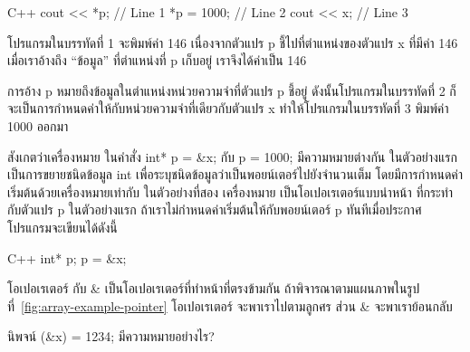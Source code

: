 \latintext
\begin{codelist}{C++}{}
cout << *p;       // Line 1
*p = 1000;        // Line 2
cout << x;        // Line 3
\end{codelist}
\thaitext

โปรแกรม{\wbr}ใน{\wbr}บรรทัด{\wbr}ที่ 1 จะ{\wbr}พิมพ์{\wbr}ค่า 146 เนื่องจาก{\wbr}ตัวแปร {\ct p} ชี้{\wbr}ไป{\wbr}ที่{\wbr}ตำแหน่ง{\wbr}ของ{\wbr}ตัวแปร{\wbr}
{\ct x} ที่{\wbr}มี{\wbr}ค่า 146 เมื่อ{\wbr}เรา{\wbr}อ้าง{\wbr}ถึง ``ข้อมูล'' ที่{\wbr}ตำแหน่ง{\wbr}ที่ {\ct p} เก็บ{\wbr}อยู่{\wbr}
เรา{\wbr}จึง{\wbr}ได้{\wbr}ค่า{\wbr}เป็น 146

การ{\wbr}อ้าง {\ct *p} หมายถึง{\wbr}ข้อมูล{\wbr}ใน{\wbr}ตำแหน่ง{\wbr}หน่วยความจำ{\wbr}ที่{\wbr}ตัวแปร {\ct p} ชี้{\wbr}อยู่{\wbr}
ดังนั้น{\wbr}โปรแกรม{\wbr}ใน{\wbr}บรรทัด{\wbr}ที่ 2 ก็{\wbr}จะ{\wbr}เป็น{\wbr}การ{\wbr}กำหนด{\wbr}ค่า{\wbr}ให้{\wbr}กับ{\wbr}หน่วยความจำ{\wbr}ที่{\wbr}เดียวกับ{\wbr}ตัวแปร {\ct
  x} ทำ{\wbr}ให้{\wbr}โปรแกรม{\wbr}ใน{\wbr}บรรทัด{\wbr}ที่ 3 พิมพ์{\wbr}ค่า 1000 ออก{\wbr}มา{\wbr}

สังเกต{\wbr}ว่า{\wbr}เครื่องหมาย {\ct *} ใน{\wbr}คำสั่ง {\ct int* p = \&x;} กับ {\ct *p =
  1000;} มี{\wbr}ความหมาย{\wbr}ต่าง{\wbr}กัน ใน{\wbr}ตัวอย่าง{\wbr}แรก{\wbr}เป็น{\wbr}การ{\wbr}ขยาย{\wbr}ชนิด{\wbr}ข้อมูล {\ct int}
เพื่อ{\wbr}ระบุ{\wbr}ชนิด{\wbr}ข้อมูล{\wbr}ว่า{\wbr}เป็น{\wbr}พอยน์เตอร์{\wbr}ไป{\wbr}ยัง{\wbr}จำนวนเต็ม{\wbr}
โดย{\wbr}มี{\wbr}การ{\wbr}กำหนด{\wbr}ค่า{\wbr}เริ่มต้น{\wbr}ด้วย{\wbr}เครื่องหมาย{\wbr}เท่า{\wbr}กับ ใน{\wbr}ตัวอย่าง{\wbr}ที่{\wbr}สอง เครื่องหมาย {\ct *}
เป็น{\wbr}โอ{\wbr}เปอเรเตอร์{\wbr}แบบ{\wbr}นำหน้า ที่{\wbr}กระทำ{\wbr}กับ{\wbr}ตัวแปร {\ct p}  ใน{\wbr}ตัวอย่าง{\wbr}แรก ถ้า{\wbr}เรา{\wbr}ไม่{\wbr}กำหนด{\wbr}ค่า{\wbr}เริ่มต้น{\wbr}ให้{\wbr}กับ{\wbr}พอยน์เตอร์ {\ct p} ทันที{\wbr}เมื่อ{\wbr}ประกาศ โปรแกรม{\wbr}จะ{\wbr}เขียน{\wbr}ได้{\wbr}ดังนี้{\wbr}

\latintext
\begin{codelist}{C++}{}
int* p;
p = &x;
\end{codelist}
\thaitext

โอ{\wbr}เปอเรเตอร์ {\ct *} กับ {\ct \&} เป็น{\wbr}โอ{\wbr}เปอเรเตอร์{\wbr}ที่{\wbr}ทำ{\wbr}หน้าที่{\wbr}ตรงข้าม{\wbr}กัน{\wbr}
ถ้า{\wbr}พิจารณา{\wbr}ตาม{\wbr}แผนภาพ{\wbr}ใน{\wbr}รูป{\wbr}ที่~\ref{fig:array-example-pointer} โอ{\wbr}เปอเรเตอร์
{\ct *} จะ{\wbr}พา{\wbr}เรา{\wbr}ไป{\wbr}ตาม{\wbr}ลูกศร ส่วน {\ct \&} จะ{\wbr}พา{\wbr}เรา{\wbr}ย้อน{\wbr}กลับ{\wbr}

\begin{quiz}{}
นิพจน์ {\ct *(\&x) = 1234;} มี{\wbr}ความหมาย{\wbr}อย่างไร?
\end{quiz}

